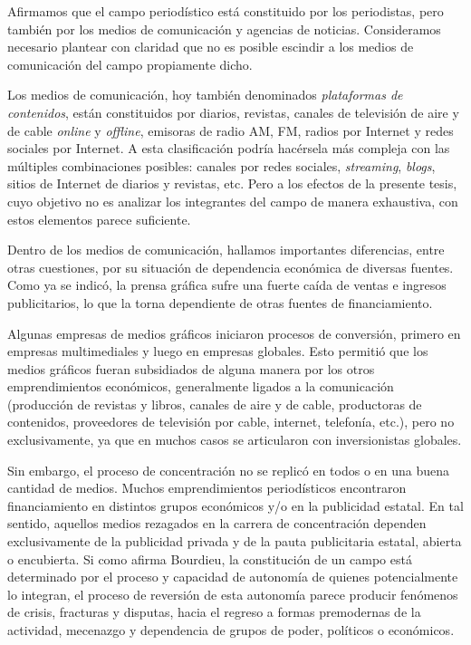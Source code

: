 Afirmamos que el campo periodístico está constituido por los periodistas, pero también por los medios de comunicación y agencias de noticias. Consideramos necesario plantear con claridad que no es posible escindir a los medios de comunicación del campo propiamente dicho.

Los medios de comunicación, hoy también denominados \emph{plataformas de contenidos}, están constituidos por diarios, revistas, canales de televisión de aire y de cable \emph{online} y \emph{offline}, emisoras de radio AM, FM, radios por Internet y redes sociales por Internet. A esta clasificación podría hacérsela más compleja con las múltiples combinaciones posibles: canales por redes sociales, \emph{streaming}, \emph{blogs}, sitios de Internet de diarios y revistas, etc. Pero a los efectos de la presente tesis, cuyo objetivo no es analizar los integrantes del campo de manera exhaustiva, con estos elementos parece suficiente.

Dentro de los medios de comunicación, hallamos importantes diferencias, entre otras cuestiones, por su situación de dependencia económica de diversas fuentes. Como ya se indicó, la prensa gráfica sufre una fuerte caída de ventas e ingresos publicitarios, lo que la torna dependiente de otras fuentes de financiamiento.

Algunas empresas de medios gráficos iniciaron procesos de conversión, primero en empresas multimediales y luego en empresas globales. Esto permitió que los medios gráficos fueran subsidiados de alguna manera por los otros emprendimientos económicos, generalmente ligados a la comunicación (producción de revistas y libros, canales de aire y de cable, productoras de contenidos, proveedores de televisión por cable, internet, telefonía, etc.), pero no exclusivamente, ya que en muchos casos se articularon con inversionistas globales.

Sin embargo, el proceso de concentración no se replicó en todos o en una buena cantidad de medios. Muchos emprendimientos periodísticos encontraron financiamiento en distintos grupos económicos y/o en la publicidad estatal. En tal sentido, aquellos medios rezagados en la carrera de concentración dependen exclusivamente de la publicidad privada y de la pauta publicitaria estatal, abierta o encubierta. Si como afirma Bourdieu, la constitución de un campo está determinado por el proceso y capacidad de autonomía de quienes potencialmente lo integran, el proceso de reversión de esta autonomía parece producir fenómenos de crisis, fracturas y disputas, hacia el regreso a formas premodernas de la actividad, mecenazgo y dependencia de grupos de poder, políticos o económicos.

